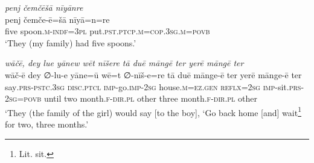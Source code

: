 \ea \label{ŽE.46}
\textit{penj čemčēšā nīyānre} \\ 
\gll penj čemče-ē=šā nīyā=n=re \\ 
 five spoon\textsc{.m}\textsc{-indf}\textsc{=3pl} put\textsc{.pst}\textsc{.ptcp}\textsc{.m}\textsc{=cop}\textsc{.3sg}\textsc{.m}\textsc{=\textsc{povb}} \\ 
\glt `They (my family) had five spoons.'
\z 
 
\ea \label{ŽE.82}
\textit{wāčē, dey lue yānew wēt nīšere tā duē māngē ter yerē māngē ter} \\ 
\gll wāč-ē dey ∅-lu-e yāne=ū wē=t ∅-nīš-e=re tā duē mānge-ē ter yerē mānge-ē ter \\ 
 say\textsc{.prs-pstc}\textsc{.3sg} \textsc{disc}.\textsc{ptcl} \textsc{imp-}go.\textsc{imp-}\textsc{2sg} house\textsc{.m}\textsc{\textsc{=ez.gen}} \textsc{reflx}\textsc{=\textsc{2sg}} \textsc{imp-}sit\textsc{.prs}-\textsc{2sg}\textsc{=\textsc{povb}} until two month\textsc{.f}\textsc{-dir}\textsc{.pl} other three month\textsc{.f}\textsc{-dir}\textsc{.pl} other \\ 
\glt `They (the family of the girl) would say [to the boy], ‘Go back home [and] wait\footnote{Lit. sit.} for two, three months.'
\z 
 
